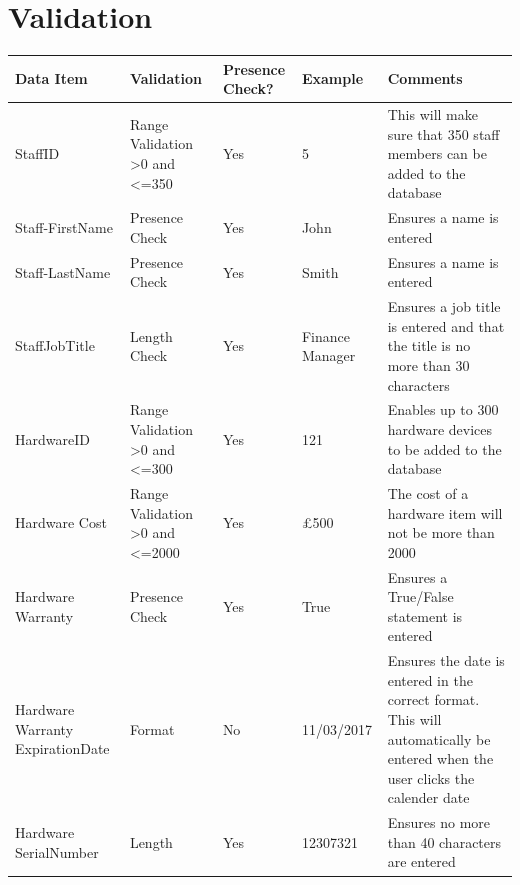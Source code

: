 \section{Validation}

\begin{center}
    \begin{longtable}{|p{2.5cm}|p{2cm}|p{3cm}|p{3cm}|p{3cm}|}
        \hline
        \textbf{Data Item} & \textbf{Validation} & \textbf{Presence Check?} & \textbf{Example} & \textbf{Comments} \\ \hline
StaffID                              & Range Validation \textgreater0 and \textless=350        &  Yes & 5        & This will make sure that 350 staff members can be added to the database   \\ \hline
Staff-FirstName                      & Presence Check                   & Yes        & John                  &  Ensures a name is entered                      \\ \hline
Staff-LastName                       & Presence Check               & Yes            & Smith                 &   Ensures a name is entered                     \\ \hline
StaffJobTitle			&   Length Check 			&Yes & Finance Manager		&Ensures a job title is entered and that the title is no more than 30 characters		\\ \hline
HardwareID                         &   Range Validation \textgreater0 and  \textless=300      &Yes                & 121                   & Enables up to 300 hardware devices to be added to the database \\ \hline
Hardware Cost                     &   Range Validation \textgreater0 and \textless=2000            &Yes                        & £500                  &  The cost of a hardware item will not be more than 2000                     \\ \hline
Hardware Warranty                    & Presence Check            &Yes               & True                  & Ensures a True/False statement is entered                      \\ \hline
Hardware Warranty ExpirationDate           & Format                      &No             & 11/03/2017               &   Ensures the date is entered in the correct format. This will automatically be entered when the user clicks the calender date                    \\ \hline
Hardware SerialNumber              & Length                 &Yes                  & 12307321              &      Ensures no more than 40 characters are entered                 \\ \hline

\end{longtable}
\end{center}
